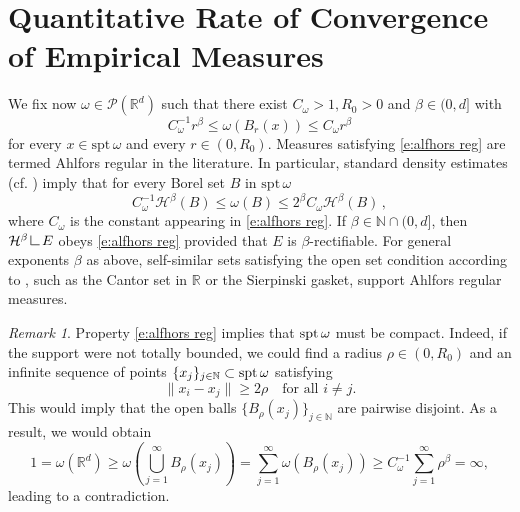 \documentclass[12pt,a4paper,oneside]{amsart}
\theoremstyle{plain}
\theoremstyle{definition}
\numberwithin{equation}{section}
\numberwithin{figure}{section}
\numberwithin{table}{section}
\theoremstyle{remark}
\newtheorem{remark}[theorem]{Remark}
\newcommand{\R}{\mathbb{R}}
\newcommand{\N}{\mathbb{N}}
\newcommand\res{\mathop{\hbox{\vrule height 7pt width .5pt depth 0pt \vrule height .5pt width 6pt depth 0pt}}\nolimits}
\newcommand{\expAhlfors}{\beta}
\begin{document}
\section{Quantitative Rate of Convergence of Empirical Measures}
We fix now $\omega\in \mathcal{P}(\R^d)$ such that there exist $C_\omega > 1,R_0>0$ and $\expAhlfors\in (0,d]$ with
\begin{equation}\tag{Ahl}\label{e:alfhors reg}
C^{-1}_\omega r^\expAhlfors \leq \omega(B_r(x)) \leq C_\omega r^\expAhlfors 
\end{equation}
for every $x\in \mathrm{spt}\, \omega$ and every $r\in (0,R_0)$. 
Measures satisfying \eqref{e:alfhors reg} are termed Ahlfors regular
in the literature. In particular, standard density estimates (cf. \cite[Theorem 2.56]{AFP}) imply that for every Borel set $B$ in 
$\mathrm{spt}\, \omega$
\[
C^{-1}_\omega \mathcal{H}^\expAhlfors(B)\leq\omega(B)\leq
2^\expAhlfors C_\omega \mathcal{H}^\expAhlfors(B)\,,
\]
where $C_\omega$ is the constant appearing in \eqref{e:alfhors reg}.
If $\expAhlfors\in\N\cap(0,d]$, then $\mathcal{H}^\expAhlfors\res E$ obeys \eqref{e:alfhors reg} provided that $E$ is $\expAhlfors$-rectifiable.
For general exponents $\beta$ as above, self-similar sets satisfying the open set condition according to \cite{Hutchinson81}, such as the Cantor set in $\R$ or the Sierpinski gasket, support Ahlfors regular measures.

\begin{remark}\label{r:supporto compatto}
Property \eqref{e:alfhors reg} implies that $\textup{spt}\, \omega$ must be compact. Indeed, if the support were not totally bounded, we could find a radius $\rho \in (0,R_0)$ and an infinite sequence of points $\{x_j\}_{j\in \N} \subset \textup{spt}\, \omega$ satisfying
\begin{equation*}
    \|x_i - x_j\| \geq 2\rho \quad \text{for all } i \neq j.
\end{equation*}
This would imply that the open balls $\{B_{\rho}(x_j)\}_{j\in \N}$ are pairwise disjoint. As a result, we would obtain
\begin{equation*}
    1 = \omega(\R^d) \geq \omega\left(\bigcup_{j=1}^\infty B_{\rho}(x_j)\right) = \sum_{j=1}^\infty \omega(B_{\rho}(x_j)) \geq C^{-1}_\omega\sum_{j=1}^\infty \rho^\expAhlfors = \infty,
\end{equation*}
leading to a contradiction.
\end{remark}
\end{document}
